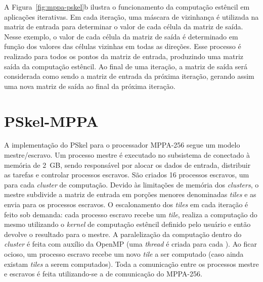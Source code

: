 \documentclass[12pt]{article}
\newcommand{\pskel}{\small \textsf{PSkel}\xspace}
\newcommand{\mppa}{\small \textsf{MPPA-256}\xspace}
\begin{document}
A Figura~\ref{fig:mppa-pskel}b ilustra o funcionamento da computação estêncil em
aplicações iterativas. Em cada iteração, uma máscara de vizinhança é utilizada
na matriz de entrada para determinar o valor de cada célula da matriz de saída.
Nesse exemplo, o valor de cada célula da matriz de saída é determinado em função
dos valores das células vizinhas em todas as direções. Esse processo é realizado
para todos os pontos da matriz de entrada, produzindo uma matriz saída da
computação estêncil. Ao final de uma iteração, a matriz de saída será
considerada como sendo a matriz de entrada da próxima iteração, gerando assim
uma nova matriz de saída ao final da próxima iteração.

\section{PSkel-MPPA}
\label{sec:pskelMPPA}

A implementação do \pskel para o processador \mppa segue um modelo
mestre/escravo. Um processo mestre é executado no subsistema de \io conectado à
memória \lpddr de 2~GB, sendo responsável por alocar os dados de entrada,
distribuir as tarefas e controlar processos escravos. São criados 16 processos
escravos, um para cada \textit{cluster} de computação. Devido às limitações de
memória dos \textit{clusters}, o mestre subdivide a matriz de entrada em porções
menores denominadas \textit{tiles} e as envia para os processos escravos. O
escalonamento dos \textit{tiles} em cada iteração é feito sob demanda: cada
processo escravo recebe um \textit{tile}, realiza a computação do mesmo
utilizando o \textit{kernel} de computação estêncil definido pelo usuário e
então devolve o resultado para o mestre. A paralelização da computação dentro do
\textit{cluster} é feita com auxílio da \api OpenMP (uma \textit{thread} é
criada para cada \pe). Ao ficar ocioso, um processo escravo recebe um novo
\textit{tile} a ser computado (caso ainda existam \textit{tiles} a serem
computados). Toda a comunicação entre os processos mestre e escravos é feita
utilizando-se a \api de comunicação do \mppa.
\end{document}

